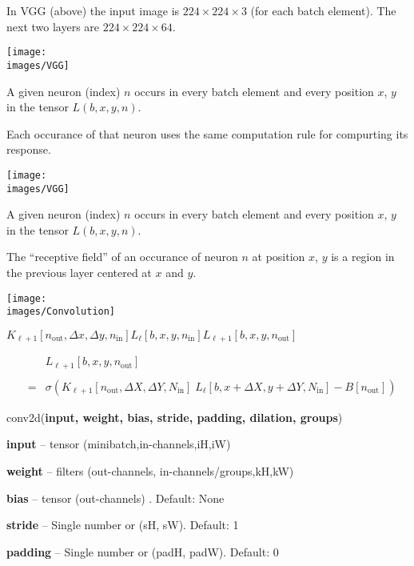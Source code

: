 {\vfill
In VGG (above) the input image is $224\times224\times3$ (for each batch element).  The next two layers are $224\times224\times64$.

\vfill
\centerline{\texttt{[image: \\images/VGG]}}

A given neuron (index) $n$ occurs in every batch element and every position $x$, $y$ in the tensor $L(b,x,y,n)$.

\vfill
Each occurance of that neuron uses the same computation rule for compurting its response.

\vfill
\centerline{\texttt{[image: \\images/VGG]}}

A given neuron (index) $n$ occurs in every batch element and every position $x$, $y$ in the tensor $L(b,x,y,n)$.

\vfill
The ``receptive field'' of an occurance of neuron $n$ at position $x$, $y$ is a region in the previous layer centered at
$x$ and $y$.


\newcommand{\nin}{n_{\mathrm{in}}}
\newcommand{\nout}{n_{\mathrm{out}}}

\centerline{\texttt{[image: \\images/Convolution]}}
\centerline{$K_{\ell+1}[\nout,\Delta x,\Delta y,\nin]$\hspace{6ex}$L_{{\ell}}[b,x,y,\nin]$\hspace{6ex}$L_{{\ell+1}}[b,x,y,\nout]$}

\begin{eqnarray*}
 & &  L_{{\ell+1}}[b,x,y,\nout] \\
 \\
  & = &   \sigma\left(K_{\ell+1}[\nout,\Delta X, \Delta Y,N_{\mathrm{in}}]\; L_{{\ell}}[b,x + \Delta X, y + \Delta Y, N_{\mathrm{in}}] - B[\nout]\right)
\end{eqnarray*}


conv2d({\bf input, weight, bias, stride, padding, dilation, groups})

\bigskip
{\bf input} – tensor (minibatch,in-channels,iH,iW)

\medskip
{\bf weight} – filters (out-channels, in-channels/groups,kH,kW)

\medskip
{\bf bias} – tensor (out-channels) . Default: None

\medskip
{\bf stride} – Single number or (sH, sW). Default: 1

\medskip
{\bf padding} – Single number or (padH, padW). Default: 0

}
